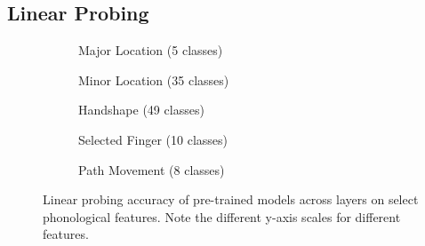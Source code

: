 \subsection{Linear Probing}
\label{sec:experimental-results-linear-probing}

\begin{figure}
    \begin{subfigure}[b]{\linewidth}
        \centering
        \renewcommand\sffamily{}
        
        \caption{Major Location (5 classes)}
        \label{fig:probing-maj-loc}
    \end{subfigure}

    \begin{subfigure}[b]{\linewidth}
        \centering
        \renewcommand\sffamily{}
        
        \caption{Minor Location (35 classes)}
        \label{fig:probing-min-loc}
    \end{subfigure}

    \begin{subfigure}[b]{\linewidth}
        \centering
        \renewcommand\sffamily{}
        
        \caption{Handshape (49 classes)}
        \label{fig:probing-handshape}
    \end{subfigure}

    \begin{subfigure}[b]{\linewidth}
        \centering
        \renewcommand\sffamily{}
        
        \caption{Selected Finger (10 classes)}
        \label{fig:probing-sel-finger}
    \end{subfigure}

    \begin{subfigure}[b]{\linewidth}
        \centering
        \renewcommand\sffamily{}
        
        \caption{Path Movement (8 classes)}
        \label{fig:probing-path-mov}
    \end{subfigure}
    \centering
    \renewcommand\sffamily{}
    
    \caption{Linear probing accuracy of pre-trained models across layers on select phonological features. Note the different y-axis scales for different features.}
    \label{fig:probing}
\end{figure}


